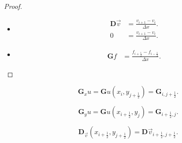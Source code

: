 \begin{proof}\leavevmode
	\begin{itemize}
		\item

		      \begin{align*}
			      \symbf{D}\vec{v} & =
			      \frac{v_{i+1}-v_{i}}{\Delta x}. \\
			      0                & =
			      \frac{v_{i+1}-v_{i}}{\Delta x}.
		      \end{align*}

		\item

		      \begin{align*}
			      \symbf{G}f & =
			      \frac{f_{i+\frac{1}{2}}-f_{i-\frac{1}{2}}}{\Delta x}.
		      \end{align*}
	\end{itemize}
\end{proof}

\begin{equation*}
	\symbf{G}_{x}u=
	\symbf{G}u\left(x_{i},y_{j+\frac{1}{2}}\right)=
	\symbf{G}_{i,j+\frac{1}{2}}.
\end{equation*}

\begin{equation*}
	\symbf{G}_{y}u=
	\symbf{G}u\left(x_{i+\frac{1}{2}},y_{j}\right)=
	\symbf{G}_{i+\frac{1}{2},j}.
\end{equation*}

\begin{equation*}
	\symbf{D}_{\vec{v}}\left(x_{i+\frac{1}{2}},y_{j+\frac{1}{2}}\right)=
	\symbf{D}\vec{v}_{i+\frac{1}{2},j+\frac{1}{2}}.
\end{equation*}


